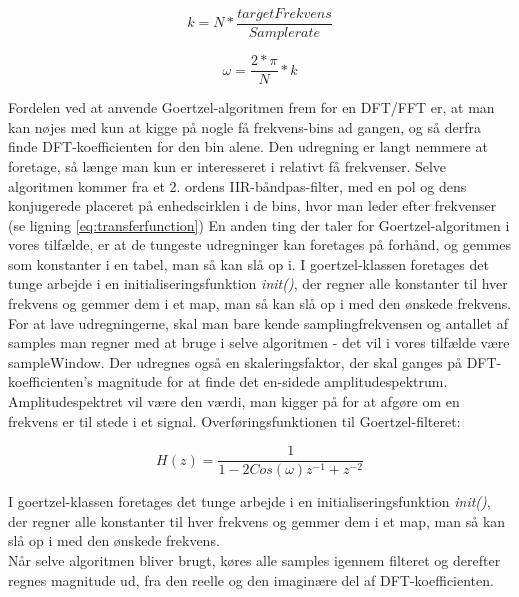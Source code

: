 \noindent\begin{minipage}{.5\linewidth}
\begin{equation} \label{eq:targetBin}
 k=N*\dfrac{targetFrekvens}{Samplerate}
\end{equation}
\end{minipage}%
\begin{minipage}{.5\linewidth}
\begin{equation}
\label{eq:omega}  
\omega = \dfrac{2*\pi}{N}*k
\end{equation}
\end{minipage}


Fordelen ved at anvende Goertzel-algoritmen frem for en DFT/FFT er, at man kan nøjes med kun at kigge på nogle få frekvens-bins ad gangen, og så derfra finde DFT-koefficienten for den bin alene. Den udregning er langt nemmere at foretage, så længe man kun er interesseret i relativt få frekvenser. Selve algoritmen kommer fra et 2. ordens IIR-båndpas-filter, med en pol og dens konjugerede placeret på enhedscirklen i de bins, hvor man leder efter frekvenser (se ligning \eqref{eq:transferfunction}) En anden ting der taler for Goertzel-algoritmen i vores tilfælde, er at de tungeste udregninger kan foretages på forhånd, og gemmes som konstanter i en tabel, man så kan slå op i. I goertzel-klassen foretages det tunge arbejde i en initialiseringsfunktion \textit{init()}, der regner alle konstanter til hver frekvens og gemmer dem i et map, man så kan slå op i med den ønskede frekvens. For at lave udregningerne, skal man bare kende samplingfrekvensen og antallet af samples man regner med at bruge i selve algoritmen - det vil i vores tilfælde være sampleWindow. Der udregnes også en skaleringsfaktor, der skal ganges på DFT-koefficienten's magnitude for at finde det en-sidede amplitudespektrum. Amplitudespektret vil være den værdi, man kigger på for at afgøre om en frekvens er til stede i et signal. 
Overføringsfunktionen til Goertzel-filteret:



\begin{equation}\label{eq:transferfunction}
H(z) = \frac{1}{1-2Cos(\omega)z^{-1}+z^{-2}}
\end{equation}


I goertzel-klassen foretages det tunge arbejde i en initialiseringsfunktion \textit{init()}, der regner alle konstanter til hver frekvens og gemmer dem i et map, man så kan slå op i med den ønskede frekvens. \\
Når selve algoritmen bliver brugt, køres alle samples igennem filteret og derefter regnes magnitude ud, fra den reelle og den imaginære del af DFT-koefficienten.





